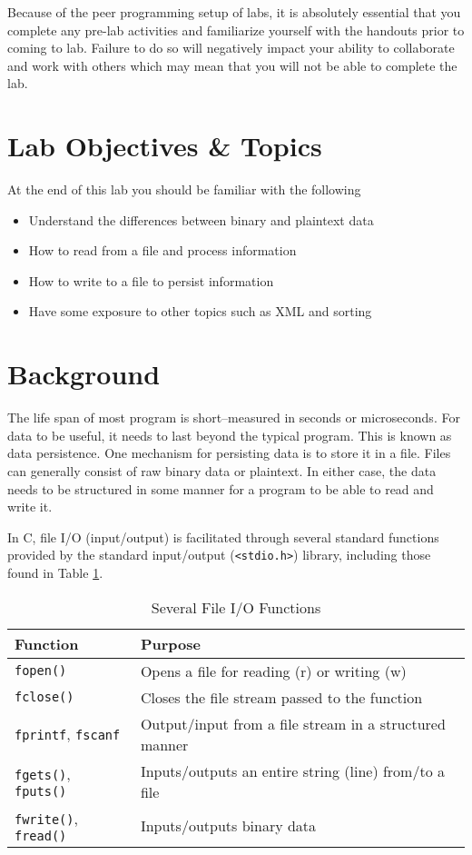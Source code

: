 \documentclass[12pt]{scrartcl}
\begin{document}
Because of the peer programming setup of labs, it is absolutely 
essential that you complete any pre-lab activities and familiarize
yourself with the handouts prior to coming to lab.  Failure to do
so will negatively impact your ability to collaborate and work with 
others which may mean that you will not be able to complete the
lab.  


\section{Lab Objectives \& Topics}
At the end of this lab you should be familiar with the following
\begin{itemize}
  \item Understand the differences between binary and plaintext data
  \item How to read from a file and process information
  \item How to write to a file to persist information
  \item Have some exposure to other topics such as XML and sorting
\end{itemize}

\section{Background}

The life span of most program is short--measured in seconds or 
microseconds.  For data to be useful, it needs to last beyond the 
typical program.  This is known as data persistence.  One mechanism 
for persisting data is to store it in a file.  Files can generally consist 
of raw binary data or plaintext.  In either case, the data needs to be 
structured in some manner for a program to be able to read and write 
it.

In C, file I/O (input/output) is facilitated through several standard 
functions provided by the standard input/output (\texttt{<stdio.h>})
library, including those found in Table \ref{table:functions}.

\begin{table}
\centering
\begin{tabular}{l|l}
Function & Purpose \\
\hline\hline
\texttt{fopen()} & Opens a file for reading (r) or writing (w) \\
\texttt{fclose()} & Closes the file stream passed to the function \\
\texttt{fprintf}, \texttt{fscanf} & Output/input from a file stream in a structured manner \\
\texttt{fgets()}, \texttt{fputs()} & Inputs/outputs an entire string (line) from/to a file \\
\texttt{fwrite()}, \texttt{fread()} & Inputs/outputs binary data \\
\end{tabular}
\caption{Several File I/O Functions}
\label{table:functions}
\end{table}
\end{document}
